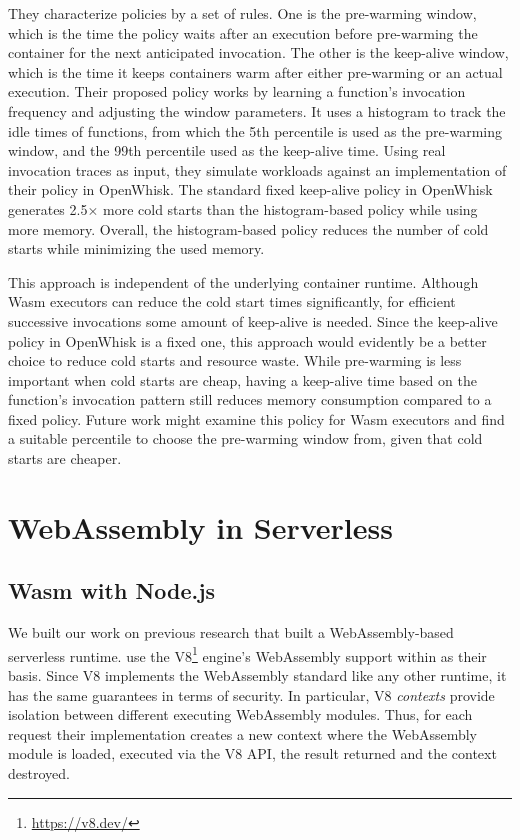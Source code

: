 They characterize policies by a set of rules. One is the pre-warming window, which is the time the policy waits after an execution before pre-warming the container for the next anticipated invocation. The other is the keep-alive window, which is the time it keeps containers warm after either pre-warming or an actual execution.
Their proposed policy works by learning a function's invocation frequency and adjusting the window parameters. It uses a histogram to track the idle times of functions, from which the 5th percentile is used as the pre-warming window, and the 99th percentile used as the keep-alive time.
Using real invocation traces as input, they simulate workloads against an implementation of their policy in OpenWhisk. 
The standard fixed keep-alive policy in OpenWhisk generates 2.5$\times$ more cold starts than the histogram-based policy while using more memory. Overall, the histogram-based policy reduces the number of cold starts while minimizing the used memory.

This approach is independent of the underlying container runtime. Although Wasm executors can reduce the cold start times significantly, for efficient successive invocations some amount of keep-alive is needed. Since the keep-alive policy in OpenWhisk is a fixed one, this approach would evidently be a better choice to reduce cold starts and resource waste. While pre-warming is less important when cold starts are cheap, having a keep-alive time based on the function's invocation pattern still reduces memory consumption compared to a fixed policy. Future work might examine this policy for Wasm executors and find a suitable percentile to choose the pre-warming window from, given that cold starts are cheaper.

\section{WebAssembly in Serverless}

\subsection{Wasm with Node.js}

We built our work on previous research that built a WebAssembly-based serverless runtime. \citeauthor{Hall2019} use the V8\footnote{\url{https://v8.dev/}} engine's WebAssembly support within  as their basis.
Since V8 implements the WebAssembly standard like any other runtime, it has the same guarantees in terms of security. In particular, V8 \emph{contexts} provide isolation between different executing WebAssembly modules. Thus, for each request their implementation creates a new context where the WebAssembly module is loaded, executed via the V8 API, the result returned and the context destroyed.

